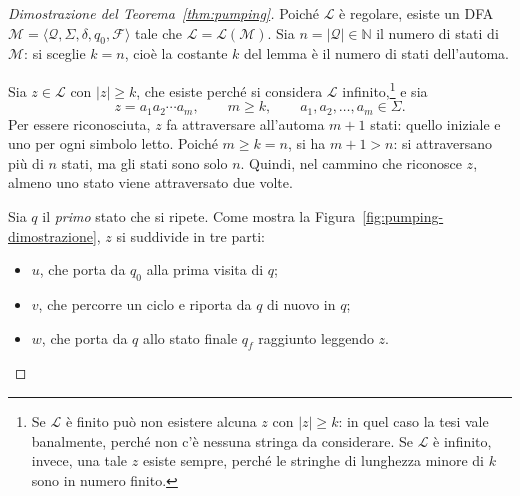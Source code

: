 \documentclass[a4paper, 11pt, oneside]{book}
\theoremstyle{formale}
\begin{document}
    \begin{proof}[Dimostrazione del Teorema~\ref{thm:pumping}]
        Poich\'e $\mathcal{L}$ \`e regolare, esiste un DFA
        $\mathcal{M} = \langle \mathcal{Q}, \Sigma, \delta, q_0, \mathcal{F} \rangle$ tale
        che $\mathcal{L} = \mathcal{L}(\mathcal{M})$. Sia $n = |\mathcal{Q}| \in \mathbb{N}$
        il numero di stati di $\mathcal{M}$: si sceglie $k = n$, cio\`e la costante $k$ del
        lemma \`e il numero di stati dell'automa.

        Sia $z \in \mathcal{L}$ con $|z| \geq k$, che esiste perch\'e si considera
        $\mathcal{L}$ infinito,\footnote{Se $\mathcal{L}$ \`e finito pu\`o non esistere
        alcuna $z$ con $|z| \geq k$: in quel caso la tesi vale banalmente, perch\'e non
        c'\`e nessuna stringa da considerare. Se $\mathcal{L}$ \`e infinito, invece, una
        tale $z$ esiste sempre, perch\'e le stringhe di lunghezza minore di $k$ sono in
        numero finito.} e sia
        \begin{equation*}
            z = a_1 a_2 \cdots a_m,
            \qquad m \geq k,
            \qquad a_1, a_2, \dots, a_m \in \Sigma.
        \end{equation*}
        Per essere riconosciuta, $z$ fa attraversare all'automa $m + 1$ stati: quello
        iniziale e uno per ogni simbolo letto. Poich\'e $m \geq k = n$, si ha $m + 1 > n$:
        si attraversano pi\`u di $n$ stati, ma gli stati sono solo $n$. Quindi, nel
        cammino che riconosce $z$, almeno uno stato viene attraversato due volte.

        Sia $q$ il \emph{primo} stato che si ripete. Come mostra la
        Figura~\ref{fig:pumping-dimostrazione}, $z$ si suddivide in tre parti:
        \begin{itemize}
            \item $u$, che porta da $q_0$ alla prima visita di $q$;
            \item $v$, che percorre un ciclo e riporta da $q$ di nuovo in $q$;
            \item $w$, che porta da $q$ allo stato finale $q_f$ raggiunto leggendo $z$.
        \end{itemize}

        \begin{figure}[H]
            \centering
\end{figure}
\end{proof}
\end{document}
